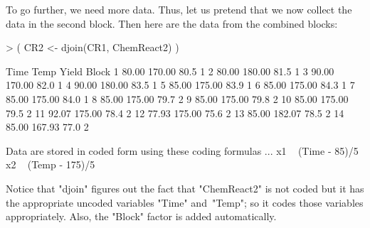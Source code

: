 \documentclass[article,nojss]{jss}
\begin{document}
To go further, we need more data.  Thus, let us pretend that we now collect the data in the second block. 
Then here are the data from the combined blocks:
\begin{Schunk}
\begin{Sinput}
> ( CR2 <- djoin(CR1, ChemReact2) )
\end{Sinput}
\begin{Soutput}
    Time   Temp Yield Block
1  80.00 170.00  80.5     1
2  80.00 180.00  81.5     1
3  90.00 170.00  82.0     1
4  90.00 180.00  83.5     1
5  85.00 175.00  83.9     1
6  85.00 175.00  84.3     1
7  85.00 175.00  84.0     1
8  85.00 175.00  79.7     2
9  85.00 175.00  79.8     2
10 85.00 175.00  79.5     2
11 92.07 175.00  78.4     2
12 77.93 175.00  75.6     2
13 85.00 182.07  78.5     2
14 85.00 167.93  77.0     2

Data are stored in coded form using these coding formulas ...
x1 ~ (Time - 85)/5
x2 ~ (Temp - 175)/5
\end{Soutput}
\end{Schunk}
Notice that "djoin" figures out the fact that "ChemReact2" is not coded but it has the appropriate uncoded variables "Time" and~"Temp"; so it codes those variables appropriately. Also, the "Block" factor is added automatically.
\end{document}
